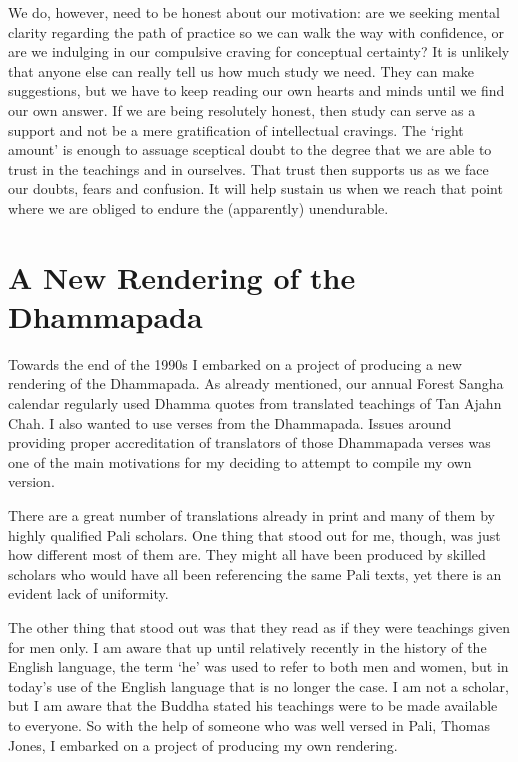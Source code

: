 We do, however, need to be honest about our motivation: are we seeking
mental clarity regarding the path of practice so we can walk the way
with confidence, or are we indulging in our compulsive craving for
conceptual certainty? It is unlikely that anyone else can really tell us
how much study we need. They can make suggestions, but we have to keep
reading our own hearts and minds until we find our own answer. If we are
being resolutely honest, then study can serve as a support and not be a
mere gratification of intellectual cravings. The `right amount' is
enough to assuage sceptical doubt to the degree that we are able to
trust in the teachings and in ourselves. That trust then supports us as
we face our doubts, fears and confusion. It will help sustain us when we
reach that point where we are obliged to endure the (apparently)
unendurable.

\section{A New Rendering of the Dhammapada}

Towards the end of the 1990s I embarked on a project of producing a new
rendering of the Dhammapada\cite{dhammapada}.
As already mentioned, our annual Forest Sangha calendar
regularly used Dhamma quotes from translated teachings of Tan Ajahn
Chah. I also wanted to use verses from the Dhammapada. Issues around
providing proper accreditation of translators of those Dhammapada verses
was one of the main motivations for my deciding to attempt to compile my
own version.

There are a great number of translations already in print and many of
them by highly qualified Pali scholars. One thing that stood out for me,
though, was just how different most of them are. They might all have
been produced by skilled scholars who would have all been referencing
the same Pali texts, yet there is an evident lack of uniformity.

The other thing that stood out was that they read as if they were
teachings given for men only. I am aware that up until relatively
recently in the history of the English language, the term `he' was used
to refer to both men and women, but in today's use of the English
language that is no longer the case. I am not a scholar, but I am aware
that the Buddha stated his teachings were to be made available to
everyone. So with the help of someone who was well versed in Pali,
Thomas Jones, I embarked on a project of producing my own rendering.

